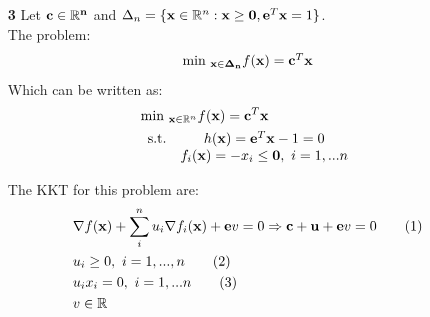 \documentclass[12pt]{article}
\newcommand\numberthis{\addtocounter{equation}{1}\tag{\theequation}}	%
\begin{document}
\begin{enumerate}
		\newpage
		\item[\bf 3] Let ${\bf c\in \mathbb{R}^n}$ and $\Delta_n=\{{\bf x}\in\mathbb{R}^n : {\bf x} \geq {\bf 0},{\bf e}^T{\bf x}=1\}$.\\
			The problem:
			\begin{align*}
				\begin{array}{c}
					\text{min }_{{\bf x\in \Delta_n}} f({\bf x})={\bf c}^T{\bf x}
				\end{array}
			\end{align*}
			Which can be written as:
			\begin{align*}
				&\text{min }_{{\bf x}\in \mathbb{R}^n} f({\bf x})={\bf c}^T{\bf x}\\
				&\begin{array}{cc}
					\text {s.t.}&h({\bf x})={\bf e}^T{\bf x} -1 = 0\\
					& f_i({\bf x})=-x_i\leq {\bf 0},\ i=1,...n
				\end{array}
			\end{align*}
		
			The KKT for this problem are:
			\begin{align*}
				&\nabla f({\bf x}) + \sum_i^n u_i\nabla f_i({\bf x}) + {\bf e}v = 0 \Rightarrow{\bf c} + {\bf u} + {\bf e}v = 0 \numberthis\\
				&u_i\geq0,\ i=1,...,n \numberthis\\
				&u_ix_i= 0,\ i=1,...n \numberthis\\
				&v\in\mathbb{R}
			\end{align*}
		

\end{enumerate}
\end{document}
